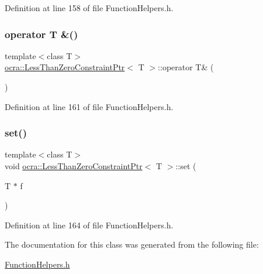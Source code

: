Definition at line 158 of file Function\+Helpers.\+h.

\hypertarget{classocra_1_1LessThanZeroConstraintPtr_a59c8bc05c7586d98607a1874ad536946}{}\label{classocra_1_1LessThanZeroConstraintPtr_a59c8bc05c7586d98607a1874ad536946} 
\subsubsection{\texorpdfstring{operator T \&()}{operator T \&()}}
{\footnotesize\ttfamily template$<$class T$>$ \\
\hyperlink{classocra_1_1LessThanZeroConstraintPtr}{ocra\+::\+Less\+Than\+Zero\+Constraint\+Ptr}$<$ T $>$\+::operator T\& (\begin{DoxyParamCaption}{ }\end{DoxyParamCaption})\hspace{0.3cm}{\ttfamily [inline]}}



Definition at line 161 of file Function\+Helpers.\+h.

\hypertarget{classocra_1_1LessThanZeroConstraintPtr_a7f0fc4747b1648423d3664b5def67589}{}\label{classocra_1_1LessThanZeroConstraintPtr_a7f0fc4747b1648423d3664b5def67589} 
\subsubsection{\texorpdfstring{set()}{set()}}
{\footnotesize\ttfamily template$<$class T$>$ \\
void \hyperlink{classocra_1_1LessThanZeroConstraintPtr}{ocra\+::\+Less\+Than\+Zero\+Constraint\+Ptr}$<$ T $>$\+::set (\begin{DoxyParamCaption}\item[{T $\ast$}]{f }\end{DoxyParamCaption})\hspace{0.3cm}{\ttfamily [inline]}}



Definition at line 164 of file Function\+Helpers.\+h.



The documentation for this class was generated from the following file\+:\begin{DoxyCompactItemize}
\item 
\hyperlink{FunctionHelpers_8h}{Function\+Helpers.\+h}\end{DoxyCompactItemize}
